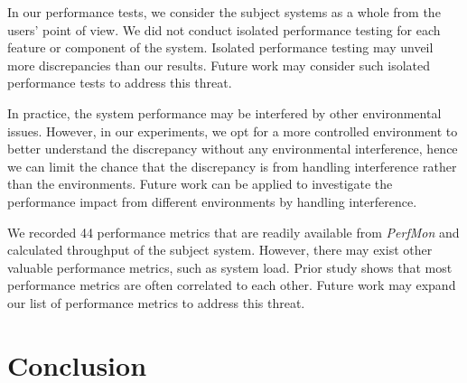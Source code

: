 \documentclass[smallextended]{svjour3}       %
\begin{document}
In our performance tests, we consider the subject systems as a whole from the users' point of view. We did not conduct isolated performance testing for each feature or component of the system. Isolated performance testing may unveil more discrepancies than our results. Future work may consider such isolated performance tests to address this threat.

In practice, the system performance may be interfered by other environmental issues. However, in our experiments, we opt for a more controlled environment to better understand the discrepancy without any environmental interference, hence we can limit the chance that the discrepancy is from handling interference rather than the environments. Future work can be applied to investigate the performance impact from different environments by handling interference.

We recorded 44 performance metrics that are readily available from \emph{PerfMon} and calculated throughput of the subject system. However, there may exist other valuable performance metrics, such as system load. Prior study shows that most performance metrics are often correlated to each other\cite{Malik:2010:ACL:1955601.1955936}. Future work may expand our list of performance metrics to address this threat.



\section{Conclusion}
\label{sec:conclusion}
\end{document}
